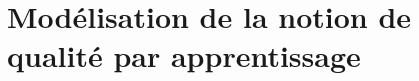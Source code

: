 
\lhead[\fancyplain{}{\leftmark}]%
      {\fancyplain{}{}} %
\chead[\fancyplain{}{}]%
      {\fancyplain{}{}}
\rhead[\fancyplain{}{}]%
      {\fancyplain{}{\rightmark}}%
\lfoot[\fancyplain{}{}]%
      {\fancyplain{}{}}
\cfoot[\fancyplain{}{\thepage}]%
      {\fancyplain{}{\thepage}} %
\rfoot[\fancyplain{}{}]%
     {\fancyplain{}{\scriptsize}}



\chapter{Modélisation de la notion de qualité par apprentissage}
\label{ch:metric_learning}

%
%


